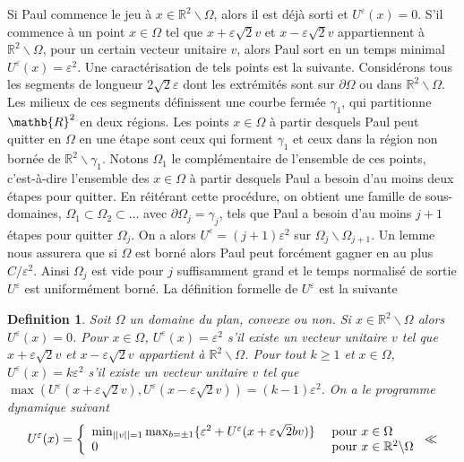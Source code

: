 \documentclass{article}
\newtheorem{definition}{Definition}
\begin{document}
Si Paul commence le jeu à $x\in\mathbb{R}^2\backslash \Omega$, alors il est déjà sorti et $U^\varepsilon(x) = 0$. S'il commence à un point $x\in\Omega$ tel que $x+\varepsilon\sqrt{2}v$ et $x-\varepsilon\sqrt{2}v$ appartiennent à $\mathbb{R}^2\backslash\Omega$, pour un certain vecteur unitaire $v$, alors Paul sort en un temps minimal $U^\varepsilon(x) = \varepsilon^2$. Une caractérisation de tels points est la suivante. Considérons tous les segments de longueur $2\sqrt{2}\varepsilon$ dont les extrémités sont sur $\partial \Omega$ ou dans $\mathbb{R}^2\backslash\Omega$. Les milieux de ces segments définissent une courbe fermée $\gamma_1$, qui partitionne $\mathb{R}^2$ en deux régions. Les points $x\in\Omega$ à partir desquels Paul peut quitter en $\Omega$ en une étape sont ceux qui forment $\gamma_1$ et ceux dans la région non bornée de $\mathbb{R}^2\backslash\gamma_1$. Notons $\Omega_1$ le complémentaire de l'ensemble de ces points, c'est-à-dire l'ensemble des $x\in\Omega$ à partir desquels Paul a besoin d'au moins deux étapes pour quitter. En réitérant cette procédure, on obtient une famille de sous-domaines, $\Omega_1\subset\Omega_2\subset\ldots$ avec $\partial\Omega_j=\gamma_j$, tels que Paul a besoin d'au moins $j+1$ étapes pour quitter $\Omega_j$. On a alors $U^\varepsilon = (j+1)\varepsilon^2$ sur $\Omega_j\backslash\Omega_{j+1}$. Un lemme nous assurera que si $\Omega$ est borné alors Paul peut forcément gagner en au plus $C/\varepsilon^2$. Ainsi $\Omega_j$ est vide pour $j$ suffisamment grand et le temps normalisé de sortie $U^\varepsilon$ est uniformément borné. La définition formelle de $U^\varepsilon$ est la suivante
\begin{definition}
	Soit $\Omega$ un domaine du plan, convexe ou non. Si $x\in\mathbb{R}^2\backslash\Omega$ alors $U^\varepsilon(x) = 0$. Pour $x\in\Omega$, $U^\varepsilon(x) = \varepsilon^2$ s'il existe un vecteur unitaire $v$ tel que $x+\varepsilon\sqrt{2}v$ et $x-\varepsilon\sqrt{2}v$ appartient à $\mathbb{R}^2\backslash \Omega$. Pour tout $k\geq 1$ et $x\in \Omega$, $U^\varepsilon(x) = k\varepsilon^2$ s'il existe un vecteur unitaire $v$ tel que $\max(U^\varepsilon(x+\varepsilon \sqrt{2}v), U^\varepsilon(x-\varepsilon \sqrt{2}v))=(k-1)\varepsilon^2$. On a le programme dynamique suivant
	\begin{align*}
		U^\varepsilon(x) =
		\left\{\begin{array}{ll}
	\min_{||v||=1}\max_{b=\pm 1} \{\varepsilon^2 + U^\varepsilon(x+\varepsilon\sqrt{2}bv)\} & \textup{ pour } x\in \Omega\\
 0 & \textup{ pour } x\in\mathbb{R}^2\backslash\Omega
\end{array}
\right.\ll
\end{align*}
\end{definition}
\end{document}
